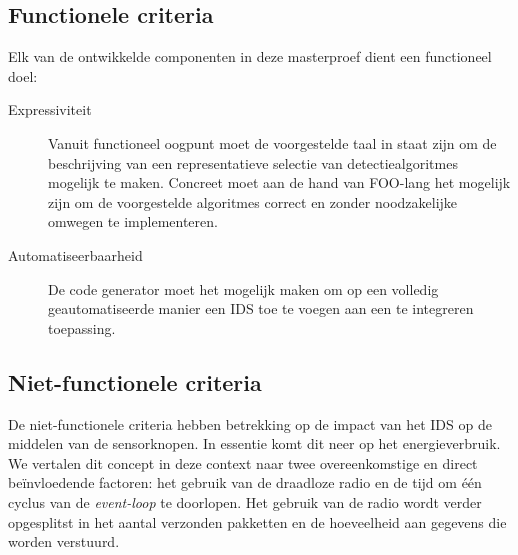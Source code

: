 \subsection{Functionele criteria}

Elk van de ontwikkelde componenten in deze masterproef dient een functioneel
doel:

\begin{description}

  \item[Expressiviteit] Vanuit functioneel oogpunt moet de voorgestelde taal in
  staat zijn om de beschrijving van een representatieve selectie van
  detectiealgoritmes mogelijk te maken. Concreet moet aan de hand van FOO-lang
  het mogelijk zijn om de voorgestelde algoritmes correct en zonder
  noodzakelijke omwegen te implementeren.

  \item[Automatiseerbaarheid] De code generator moet het mogelijk maken om op
  een volledig geautomatiseerde manier een IDS toe te voegen aan een te
  integreren toepassing.

\end{description}

\subsection{Niet-functionele criteria}

De niet-functionele criteria hebben betrekking op de impact van het IDS op de
middelen van de sensorknopen. In essentie komt dit neer op het energieverbruik.
We vertalen dit concept in deze context naar twee overeenkomstige en direct
be\"invloedende factoren: het gebruik van de draadloze radio en de tijd om
\'e\'en cyclus van de \emph{event-loop} te doorlopen. Het gebruik van de radio
wordt verder opgesplitst in het aantal verzonden pakketten en de hoeveelheid
aan gegevens die worden verstuurd.

